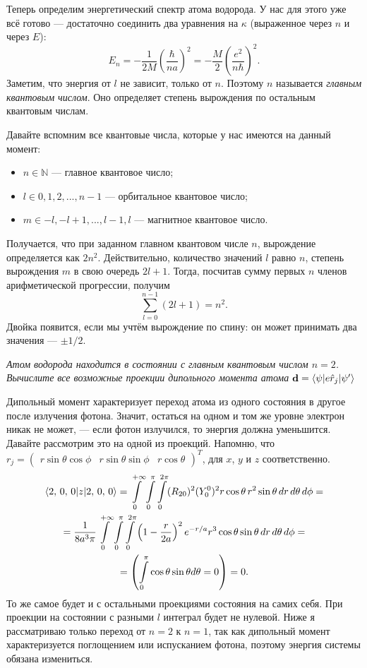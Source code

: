 Теперь определим энергетический спектр атома водорода. У нас для этого уже всё
готово --- достаточно соединить два уравнения на $\kappa$ (выраженное через $n$
и через $E$):
\[
  E_n = -\frac{1}{2M}\left(\frac{\hbar}{na}\right)^2 = -\frac{M}{2}\left(\frac{e^2}{n\hbar}\right)^2.
\]
Заметим, что энергия от $l$ не зависит, только от $n$. Поэтому $n$ называется
\textit{главным квантовым числом}. Оно определяет степень вырождения по
остальным квантовым числам.

Давайте вспомним все квантовые числа, которые у нас имеются на данный момент:
\begin{itemize}
  \item $n \in \mathbb{N}$ --- главное квантовое число;
  \item $l \in {0, 1, 2, ..., n-1}$ --- орбитальное квантовое число;
  \item $m \in {-l, -l+1, ... , l-1, l}$ --- магнитное квантовое число.
\end{itemize}
Получается, что при заданном главном квантовом числе $n$, вырождение
определяется как $2n^2$. Действительно, количество значений $l$ равно $n$,
степень вырождения $m$ в свою очередь $2l+1$. Тогда, посчитав сумму первых $n$
членов арифметической прогрессии, получим
\[
  \sum\limits_{l=0}^{n-1}(2l +1 ) = n^2.
\]
Двойка появится, если мы учтём вырождение по спину: он может принимать два
значения --- $\pm 1/2$.

\begin{exercise}
  \textit{Атом водорода находится в состоянии с главным квантовым числом $n = 2$.
    Вычислите все возможные проекции дипольного момента атома $\mathbf{d} =
      \langle\psi\rvert e\hat{r}_j\lvert\psi'\rangle$}
\end{exercise}

Дипольный момент характеризует переход атома из одного состояния в другое после
излучения фотона. Значит, остаться на одном и том же уровне электрон никак не
может, --- если фотон излучился, то энергия должна уменьшится. Давайте
рассмотрим это на одной из проекций. Напомню, что $r_j = \begin{pmatrix}
    r\sin\theta\cos\phi & r\sin\theta\sin\phi & r\cos\theta
  \end{pmatrix}^T$, для $x$, $y$ и $z$ соответственно.
\begin{gather*}
  \langle2,\, 0,\, 0\rvert z\lvert2,\, 0,\, 0\rangle = \int\limits_{0}^{+\infty}\int\limits_{0}^{\pi}\int\limits_{0}^{2\pi}(R_{20})^2(Y^0_0)^2 r\cos\theta \, r^2\sin\theta \, dr\, d\theta\, d\phi =\\ = \frac{1}{8a^3\pi} \int\limits_{0}^{+\infty}\int\limits_{0}^{\pi}\int\limits_{0}^{2\pi} \left( 1 - \frac{r}{2a} \right)^2 e^{-r/a} r^3\cos\theta\sin\theta\, dr \, d\theta\, d\phi = \\  = \left(\int\limits_{0}^{\pi} \cos\theta \sin\theta d\theta = 0\right) = 0.
\end{gather*}
То же самое будет и с остальными проекциями состояния на самих себя. При
проекции на состоянии с разными $l$ интеграл будет не нулевой. Ниже я
рассматриваю только переход от $n=2$ к $n=1$, так как дипольный момент
характеризуется поглощением или испусканием фотона, поэтому энергия системы
обязана измениться.

